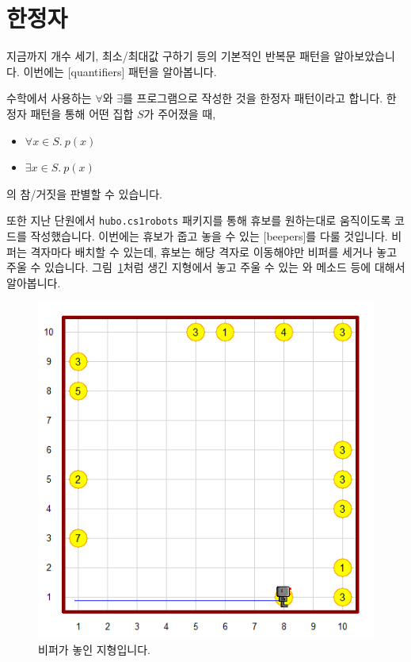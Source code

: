 \documentclass[../main.tex]{subfiles}
\begin{document}
\section{한정자}
지금까지 개수 세기, 최소/최대값 구하기 등의 기본적인 반복문 패턴을 알아보았습니다.
이번에는 [quantifiers] 패턴을 알아봅니다.

수학에서 사용하는  $\forall$와  $\exists$를 프로그램으로 작성한 것을 한정자 패턴이라고 합니다.
한정자 패턴을 통해 어떤 집합 $S$가 주어졌을 때,
\begin{itemize}
\item $\forall x \in S.\ p(x)$
\item $\exists x \in S.\ p(x)$
\end{itemize}
의 참/거짓을 판별할 수 있습니다.

또한 지난 단원에서 \texttt{hubo.cs1robots} 패키지를 통해 휴보를 원하는대로 움직이도록 코드를 작성했습니다.
이번에는 휴보가 줍고 놓을 수 있는 [beepers]를 다룰 것입니다.
비퍼는 격자마다 배치할 수 있는데, 휴보는 해당 격자로 이동해야만 비퍼를 세거나 놓고 주울 수 있습니다.
그림~\ref{fig:lecture5beeper}처럼 생긴 지형에서 놓고 주울 수 있는 와  메소드 등에 대해서 알아봅니다.

\begin{figure}[htbp]
\centering
\includegraphics[width=0.5\linewidth]{"./lectures/lecture5_beeper"}
\caption{비퍼가 놓인 지형입니다.}\label{fig:lecture5beeper}
\end{figure}
\end{document}
